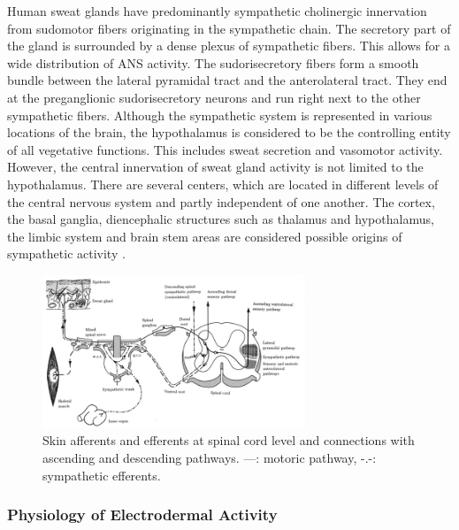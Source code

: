 Human sweat glands have predominantly sympathetic cholinergic innervation from sudomotor fibers originating in the sympathetic chain. The secretory part of the gland is surrounded by a dense plexus of sympathetic fibers. This allows for a wide distribution of ANS activity. The sudorisecretory fibers form a smooth bundle between the lateral pyramidal tract and the anterolateral tract. They end at the preganglionic sudorisecretory neurons and run right next to the other sympathetic fibers.  Although the sympathetic system is represented in various locations of the brain, the hypothalamus is considered to be the controlling entity of all vegetative functions. This includes sweat secretion and vasomotor activity. However, the central innervation of sweat gland activity is not limited to the hypothalamus. There are several centers, which are located in different levels of the central nervous system and partly independent of one another. The cortex, the basal ganglia, diencephalic structures such as thalamus and hypothalamus, the limbic system and brain stem areas are considered possible origins of sympathetic activity \citep{boucsein2013electrodermal}.

\begin{figure}[ht]
\centering
\includegraphics[width=0.7\textwidth]{images/symPathway.png}
\caption{Skin afferents and efferents at spinal cord level and connections with ascending and descending pathways. ---: motoric pathway, -.-: sympathetic efferents. \citep{boucsein2013electrodermal}}
\label{symPathImg}
\end{figure}

\subsubsection{Physiology of Electrodermal Activity}

